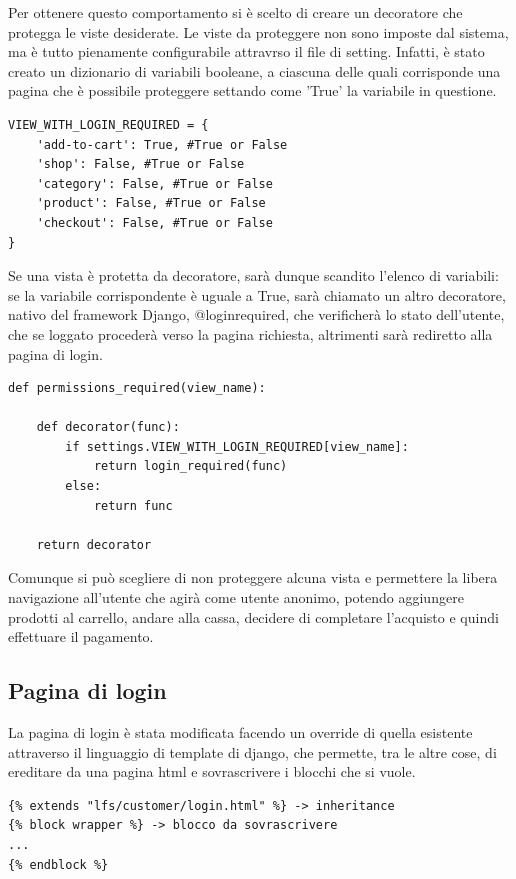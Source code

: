 Per ottenere questo comportamento si è scelto di creare un decoratore che protegga le viste desiderate.
Le viste da proteggere non sono imposte dal sistema, ma è tutto pienamente configurabile attravrso il file di setting. Infatti, è stato creato un dizionario di variabili booleane, a ciascuna delle quali corrisponde una pagina che è possibile proteggere settando come 'True' la variabile in questione.

\begin{lstlisting}
VIEW_WITH_LOGIN_REQUIRED = {
    'add-to-cart': True, #True or False
    'shop': False, #True or False
    'category': False, #True or False
    'product': False, #True or False
    'checkout': False, #True or False
}
\end{lstlisting}

Se una vista è protetta da decoratore, sarà dunque scandito l'elenco di variabili: se la variabile corrispondente è uguale a True, sarà chiamato un altro decoratore, nativo del framework Django, @login\textunderscore required, che verificherà lo stato dell'utente, che se loggato procederà verso la pagina richiesta, altrimenti sarà rediretto alla pagina di login.

\begin{lstlisting}
def permissions_required(view_name):
    
    def decorator(func):
        if settings.VIEW_WITH_LOGIN_REQUIRED[view_name]:
            return login_required(func)
        else:
            return func

    return decorator
\end{lstlisting}

Comunque si può scegliere di non proteggere alcuna vista e permettere la libera navigazione all'utente che agirà come utente anonimo, potendo aggiungere prodotti al carrello, andare alla cassa, decidere di completare l'acquisto e quindi effettuare il pagamento.

\subsection{Pagina di login}
La pagina di login è stata modificata facendo un override di quella esistente attraverso il linguaggio di template di django, che permette, tra le altre cose, di ereditare da una pagina html e sovrascrivere i blocchi che si vuole.

\begin{lstlisting}[language=html]
{% extends "lfs/customer/login.html" %} -> inheritance
{% block wrapper %} -> blocco da sovrascrivere
...
{% endblock %}
\end{lstlisting}

